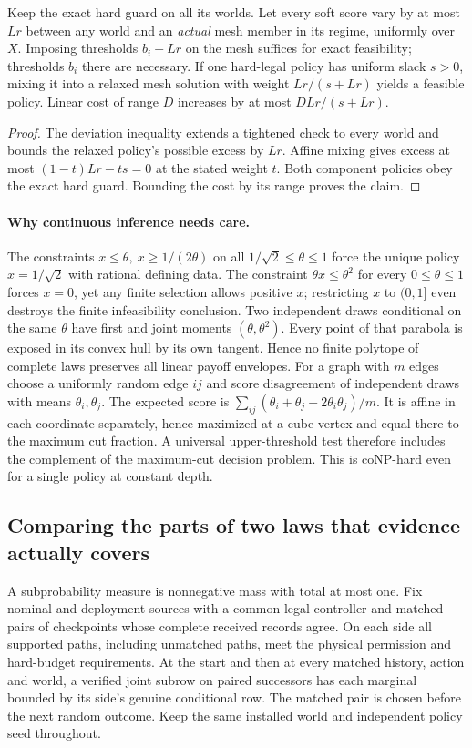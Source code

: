 \begin{theorem}\label{adv:g012}
Keep the exact hard guard on all its worlds. Let every soft score vary by at most \(Lr\) between any world and an \emph{actual} mesh member in its regime, uniformly over \(X\). Imposing thresholds \(b_i-Lr\) on the mesh suffices for exact feasibility; thresholds \(b_i\) there are necessary. If one hard-legal policy has uniform slack \(s>0\), mixing it into a relaxed mesh solution with weight \(Lr/(s+Lr)\) yields a feasible policy. Linear cost of range \(D\) increases by at most \(DLr/(s+Lr)\).
\end{theorem}
\begin{proof}
The deviation inequality extends a tightened check to every world and bounds the relaxed policy's possible excess by \(Lr\). Affine mixing gives excess at most \((1-t)Lr-ts=0\) at the stated weight \(t\). Both component policies obey the exact hard guard. Bounding the cost by its range proves the claim.
\end{proof}
\paragraph{Why continuous inference needs care.}
The constraints \(x\le\theta,\ x\ge1/(2\theta)\) on all \(1/\sqrt2\le\theta\le1\) force the unique policy \(x=1/\sqrt2\) with rational defining data. The constraint \(\theta x\le\theta^2\) for every \(0\le\theta\le1\) forces \(x=0\), yet any finite selection allows positive \(x\); restricting \(x\) to \((0,1]\) even destroys the finite infeasibility conclusion. Two independent draws conditional on the same \(\theta\) have first and joint moments \((\theta,\theta^2)\). Every point of that parabola is exposed in its convex hull by its own tangent. Hence no finite polytope of complete laws preserves all linear payoff envelopes. For a graph with \(m\) edges choose a uniformly random edge \(ij\) and score disagreement of independent draws with means \(\theta_i,\theta_j\). The expected score is \(\sum_{ij}(\theta_i+\theta_j-2\theta_i\theta_j)/m\). It is affine in each coordinate separately, hence maximized at a cube vertex and equal there to the maximum cut fraction. A universal upper-threshold test therefore includes the complement of the maximum-cut decision problem. This is coNP-hard even for a single policy at constant depth.

\subsection{Comparing the parts of two laws that evidence actually covers}
A subprobability measure is nonnegative mass with total at most one. Fix nominal and deployment sources with a common legal controller and matched pairs of checkpoints whose complete received records agree. On each side all supported paths, including unmatched paths, meet the physical permission and hard-budget requirements. At the start and then at every matched history, action and world, a verified joint subrow on paired successors has each marginal bounded by its side's genuine conditional row. The matched pair is chosen before the next random outcome. Keep the same installed world and independent policy seed throughout.

